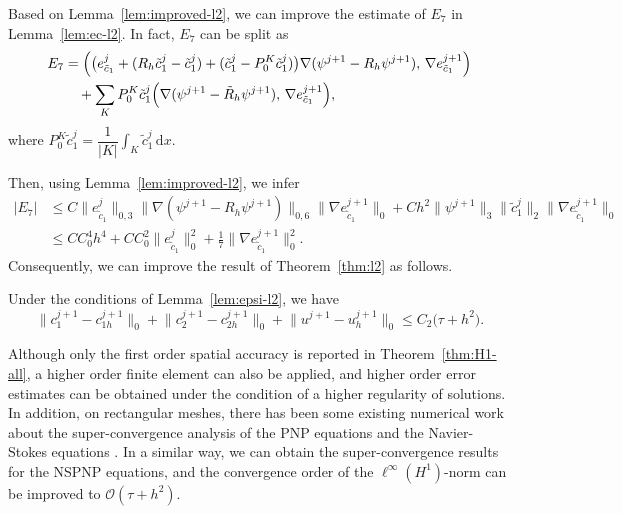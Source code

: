 Based on Lemma~\ref{lem:improved-l2}, we can improve the estimate of $E_{7}$ in
Lemma~\ref{lem:ec-l2}. In fact, $E_{7}$ can be split as
\begin{align}
  E_{7}
  &= \Bigl(\bigl(e_{\tilde{c}_{1}}^{j}
                + (R_{h}\tilde{c}_{1}^{j} - \tilde{c}_{1}^{j})
                + (\tilde{c}_{1}^{j} - P_{0}^{K}\tilde{c}_{1}^{j})\bigr)
           \nabla(\psi^{j+1} - R_{h}\psi^{j+1}),\,
           \nabla e_{\tilde{c}_{1}}^{j+1}\Bigr)
  \nonumber\\
  &\quad + \sum_{K} P_{0}^{K}\tilde{c}_{1}^{j}
    \Bigl(\nabla(\psi^{j+1} - \tilde{R}_{h}\psi^{j+1}),\,
          \nabla e_{\tilde{c}_{1}}^{j+1}\Bigr),
  \label{eq:E7-split}
\end{align}
where $P_{0}^{K}\tilde{c}_{1}^{j} = \dfrac{1}{|K|}\displaystyle\int_{K}\tilde{c}_{1}^{j}\,\mathrm{d}x$.

Then, using Lemma~\ref{lem:improved-l2}, we infer
\begin{align}
  |E_{7}|
  &\leq C\bigl\|e_{\tilde{c}_{1}}^{j}\bigr\|_{0,3}
         \bigl\|\nabla(\psi^{j+1} - R_{h}\psi^{j+1})\bigr\|_{0,6}
         \bigl\|\nabla e_{\tilde{c}_{1}}^{j+1}\bigr\|_{0}
       + Ch^{2}\bigl\|\psi^{j+1}\bigr\|_{3}\bigl\|\tilde{c}_{1}^{j}\bigr\|_{2}
         \bigl\|\nabla e_{\tilde{c}_{1}}^{j+1}\bigr\|_{0}
  \nonumber\\
  &\leq CC_{0}^{4}h^{4}
     + CC_{0}^{2}\bigl\|e_{\tilde{c}_{1}}^{j}\bigr\|_{0}^{2}
     + \frac{1}{7}\bigl\|\nabla e_{\tilde{c}_{1}}^{j+1}\bigr\|_{0}^{2}.
  \label{eq:E7-improved}
\end{align}
Consequently, we can improve the result of Theorem~\ref{thm:l2} as follows.

\begin{theorem}\label{thm:improved-l2}
Under the conditions of Lemma~\ref{lem:epsi-l2}, we have
\begin{equation}\label{eq:improved-l2-result}
  \bigl\|c_{1}^{j+1} - c_{1h}^{j+1}\bigr\|_{0}
  + \bigl\|c_{2}^{j+1} - c_{2h}^{j+1}\bigr\|_{0}
  + \bigl\|u^{j+1} - u_{h}^{j+1}\bigr\|_{0}
  \leq C_{2}\bigl(\tau + h^{2}\bigr).
\end{equation}
\end{theorem}

\begin{remark}\label{rem:higher-order}
Although only the first order spatial accuracy is reported in Theorem~\ref{thm:H1-all},
a higher order finite element can also be applied, and higher order error estimates can be
obtained under the condition of a higher regularity of solutions. In addition, on rectangular
meshes, there has been some existing numerical work about the super-convergence analysis of
the PNP equations and the Navier-Stokes equations \cite{Shi2019,Lin2006}. In a similar way,
we can obtain the super-convergence results for the NSPNP equations, and the convergence
order of the $\ell^{\infty}(H^{1})$-norm can be improved to $\mathcal{O}(\tau + h^{2})$.
\end{remark}
